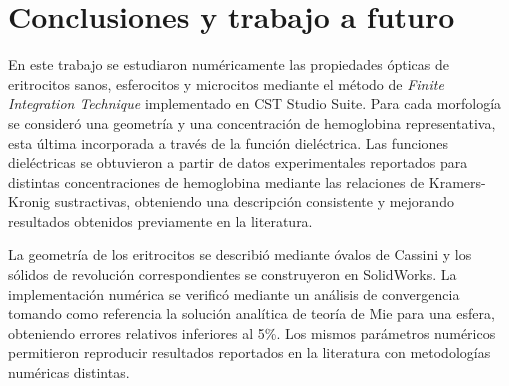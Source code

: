 \chapter*{Conclusiones y trabajo a futuro}
\label{chapter:concl}

En este trabajo se estudiaron numéricamente las propiedades ópticas de eritrocitos sanos, esferocitos y microcitos mediante el método de \textit{Finite Integration Technique} implementado en CST Studio Suite. Para cada morfología se consideró una geometría y una concentración de hemoglobina representativa, esta última incorporada a través de la función dieléctrica. Las funciones dieléctricas se obtuvieron a partir de datos experimentales reportados para distintas concentraciones de hemoglobina mediante las relaciones de Kramers-Kronig sustractivas, obteniendo una descripción consistente y mejorando resultados obtenidos previamente en la literatura.

La geometría de los eritrocitos se describió mediante óvalos de Cassini y los sólidos de revolución correspondientes se construyeron en SolidWorks. La implementación numérica se verificó mediante un análisis de convergencia tomando como referencia la solución analítica de teoría de Mie para una esfera, obteniendo errores relativos inferiores al 5\%. Los mismos parámetros numéricos permitieron reproducir resultados reportados en la literatura con metodologías numéricas distintas.
    
